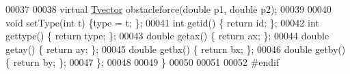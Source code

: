 \begin{DoxyCode}
00037                 
00038                 \textcolor{keyword}{virtual} \hyperlink{classPed_1_1Tvector}{Tvector} obstacleforce(\textcolor{keywordtype}{double} p1, \textcolor{keywordtype}{double} p2);
00039                 
00040                 \textcolor{keywordtype}{void} setType(\textcolor{keywordtype}{int} t) \{type = t; \};
00041                 \textcolor{keywordtype}{int} getid() \{ \textcolor{keywordflow}{return} id; \};      
00042                 \textcolor{keywordtype}{int} gettype() \{ \textcolor{keywordflow}{return} type; \};  
00043                 \textcolor{keywordtype}{double} getax() \{ \textcolor{keywordflow}{return} ax; \};   
00044                 \textcolor{keywordtype}{double} getay() \{ \textcolor{keywordflow}{return} ay; \};   
00045                 \textcolor{keywordtype}{double} getbx() \{ \textcolor{keywordflow}{return} bx; \};   
00046                 \textcolor{keywordtype}{double} getby() \{ \textcolor{keywordflow}{return} by; \};   
00047         \};
00048         
00049 \}
00050 
00051 
00052 \textcolor{preprocessor}{#endif}
\end{DoxyCode}
